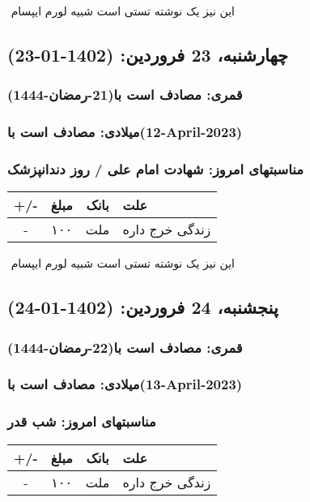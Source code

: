 \documentclass{article}
\newcommand{\rnote}[1]{\marginpar{\textcolor{color}{\StrSubstitute{\##1}{ }{\_}}}}
\newcommand{\myRow}[4]{
    #1 & #2 & #3 & #4 \\ \hline
}
\begin{document}
‌
\rnote{تست}
این نیز یک نوشته تستی است شبیه لورم ایپسام




\newpage
{}
\textcolor{color}{
\section{ چهارشنبه، 23 فروردین: (1402-01-23) }
\subsubsection*{قمری: مصادف است با(21-رمضان-1444)} 
\subsubsection*{میلادی: مصادف است با(12-April-2023)}
\subsubsection*{مناسبتهای امروز: شهادت امام علی / روز دندانپزشک}
}


\begin{tabular}{ | c | c | c | p{5cm} |}
    \hline
    \myRow{ +/- }{مبلغ}{بانک}{علت}
    \myRow{-}{۱۰۰}{ملت}{زندگی خرج داره}
\end{tabular}
\newline
\newline

‌
\rnote{تست}
این نیز یک نوشته تستی است شبیه لورم ایپسام




\newpage
{}
\textcolor{color}{
\section{ پنجشنبه، 24 فروردین: (1402-01-24) }
\subsubsection*{قمری: مصادف است با(22-رمضان-1444)} 
\subsubsection*{میلادی: مصادف است با(13-April-2023)}
\subsubsection*{مناسبتهای امروز: شب قدر}
}


\begin{tabular}{ | c | c | c | p{5cm} |}
    \hline
    \myRow{ +/- }{مبلغ}{بانک}{علت}
    \myRow{-}{۱۰۰}{ملت}{زندگی خرج داره}
\end{tabular}
\newline
\newline
\end{document}
